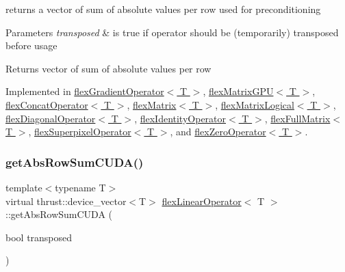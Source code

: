returns a vector of sum of absolute values per row used for preconditioning 


\begin{DoxyParams}{Parameters}
{\em transposed} & is true if operator should be (temporarily) transposed before usage \\
\hline
\end{DoxyParams}
\begin{DoxyReturn}{Returns}
vector of sum of absolute values per row 
\end{DoxyReturn}


Implemented in \hyperlink{classflex_gradient_operator_a04950a1e57f7587b95824bfd82b35738}{flex\+Gradient\+Operator$<$ T $>$}, \hyperlink{classflex_matrix_g_p_u_a0a1f19c482243223b8d98165d0b44ccf}{flex\+Matrix\+G\+P\+U$<$ T $>$}, \hyperlink{classflex_concat_operator_a6cae0c9545cf1afd8ac0ebc418fa3327}{flex\+Concat\+Operator$<$ T $>$}, \hyperlink{classflex_matrix_a75f378787fc81ea2c570c9848a7f2588}{flex\+Matrix$<$ T $>$}, \hyperlink{classflex_matrix_logical_a0c7cf2e5dde3a2d55ae95c6e54f94342}{flex\+Matrix\+Logical$<$ T $>$}, \hyperlink{classflex_diagonal_operator_ad53cb526b55141a1d0519a023572cf58}{flex\+Diagonal\+Operator$<$ T $>$}, \hyperlink{classflex_identity_operator_afe7f2f91fc5f563c2261937f272c0255}{flex\+Identity\+Operator$<$ T $>$}, \hyperlink{classflex_full_matrix_a911d6b2a452edb8233f56c1e5250855e}{flex\+Full\+Matrix$<$ T $>$}, \hyperlink{classflex_superpixel_operator_afd3f55401eaa6fb3e8a62c7f83443a4d}{flex\+Superpixel\+Operator$<$ T $>$}, and \hyperlink{classflex_zero_operator_a4c9fbbcd1961590e2fabef75197f4367}{flex\+Zero\+Operator$<$ T $>$}.

\mbox{\label{classflex_linear_operator_a0a0a431d43f4f9d36cbee0d31ba5a29b}} 
\subsubsection{\texorpdfstring{get\+Abs\+Row\+Sum\+C\+U\+D\+A()}{getAbsRowSumCUDA()}}
{\footnotesize\ttfamily template$<$typename T$>$ \\
virtual thrust\+::device\+\_\+vector$<$T$>$ \hyperlink{classflex_linear_operator}{flex\+Linear\+Operator}$<$ T $>$\+::get\+Abs\+Row\+Sum\+C\+U\+DA (\begin{DoxyParamCaption}\item[{bool}]{transposed }\end{DoxyParamCaption})\hspace{0.3cm}{\ttfamily [pure virtual]}}



